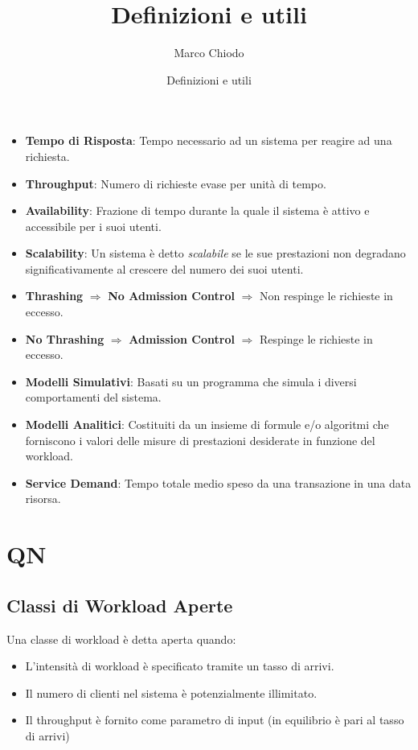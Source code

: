 \documentclass[11pt,a4paper]{article}
\title{Definizioni e utili}
\author{Marco Chiodo}
\date{Definizioni e utili}
\begin{document}
    \maketitle


    \begin{itemize}
        \item \textbf{Tempo di Risposta}: Tempo necessario ad un sistema per reagire ad una richiesta.
        \item \textbf{Throughput}: Numero di richieste evase per unità di tempo.
        \item \textbf{Availability}: Frazione di tempo durante la quale il sistema è attivo e accessibile per i suoi utenti.
        \item \textbf{Scalability}: Un sistema è detto \textit{scalabile} se le sue prestazioni non degradano significativamente al crescere del numero dei suoi utenti.
        \item \textbf{Thrashing} $\Rightarrow$ \textbf{No Admission Control} $\Rightarrow$ Non respinge le richieste in eccesso.
        \item \textbf{No Thrashing} $\Rightarrow$ \textbf{Admission Control} $\Rightarrow$ Respinge le richieste in eccesso.
        \item \textbf{Modelli Simulativi}: Basati su un programma che simula i diversi comportamenti del sistema.
        \item \textbf{Modelli Analitici}: Costituiti da un insieme di formule e/o algoritmi che forniscono i valori delle misure di prestazioni desiderate in funzione del workload.
        \item \textbf{Service Demand}: Tempo totale medio speso da una transazione in una data risorsa.
    \end{itemize}

    \section{QN}
    \subsection{Classi di Workload Aperte}
    Una classe di workload è detta aperta quando:
    \begin{itemize}
        \item L'intensità di workload è specificato tramite un tasso di arrivi.
        \item Il numero di clienti nel sistema è potenzialmente illimitato.
        \item Il throughput è fornito come parametro di input (in equilibrio è pari al tasso di arrivi)
    \end{itemize}
\end{document}
